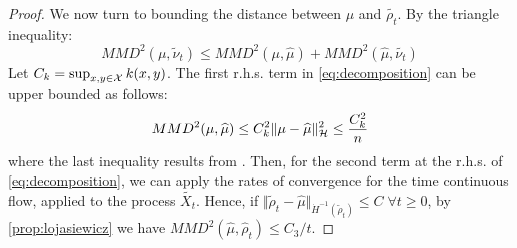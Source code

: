 \begin{proof}
	
	We now turn to bounding the distance between $\mu$ and $\widetilde{\rho_t}$. By the triangle inequality:
	\begin{equation}\label{eq:decomposition}
	MMD^2(\mu, \widetilde{\nu}_t)\le MMD^2(\mu, \widehat{\mu})+MMD^2(\widehat{\mu}, \widetilde{\nu_t})%
	\end{equation}
	Let $C_k=\sup_{x,y \in {{\mathcal X}}}k(x,y)$. The first r.h.s. term in \eqref{eq:decomposition} can be upper bounded as follows:
	\begin{equation}
	MMD^2( \mu,\widehat{\mu})\le C_k^2 \| \mu - \widehat{\mu}\|^2_{{{\mathcal H}}}\le \frac{C_k^2}{n}
	\end{equation}
	where the last inequality results from \cite{tolstikhin2017minimax}.
	Then, for the second term at the r.h.s. of  \eqref{eq:decomposition}, we can apply the rates of convergence for the time continuous flow, applied to the process $\widetilde{X_t}$. Hence, if $\Vert \widetilde{\rho}_t  - \widehat{\mu} \Vert_{\dot{H}^{-1}(\widetilde{\rho}_t)} \leq C \; \forall t\geq 0$, by \cref{prop:lojasiewicz} we have $MMD^2(\widehat{ \mu},\widehat{\rho}_t)\le C_3/t$. 
\end{proof}